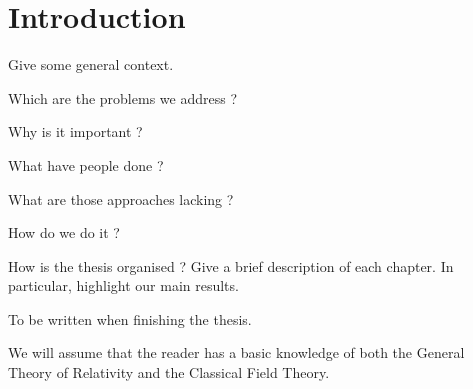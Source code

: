 \chapter*{Introduction}
\label{intro} 

Give some general context.

Which are the problems we address ?

Why is it important ?

What have people done ? 

What are those approaches lacking ? 

How do we do it ? 

How is the thesis organised ? Give a brief description of each chapter. In particular, highlight our main results.

To be written when finishing the thesis.

We will assume that the reader has a basic knowledge of both the General Theory of Relativity and the Classical Field Theory.

 